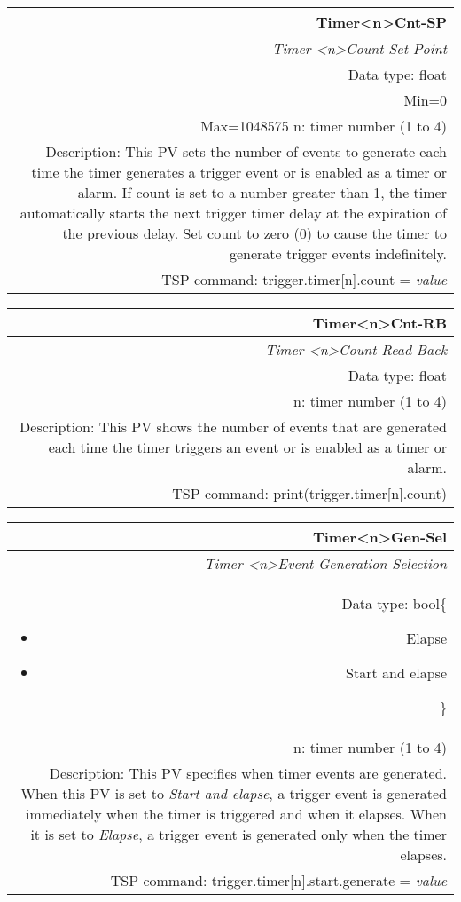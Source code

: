 \documentclass[openany]{article}
\begin{document}
		\begin{tabular}{N}
			\hline
			\bfseries Timer{\textless n\textgreater}Cnt-SP\label{pv:timercount-sp} \\ \hline
			\emph{Timer \textless n\textgreater Count Set Point} \\
			Data type: float \\
			Min=0 \\
			Max=1048575
			n: timer number (1 to 4) \\
			Description: This PV sets the number of events to generate each time the timer generates a trigger event or is enabled as a timer or alarm. If count is set to a number greater than 1, the timer automatically starts the next trigger timer delay at the expiration of the previous delay. Set count to zero (0) to cause the timer to generate trigger events indefinitely. \\
			TSP command: trigger.timer[n].count = \emph{value}
		\end{tabular}

		\begin{tabular}{N}
			\hline
			\bfseries Timer{\textless n\textgreater}Cnt-RB\label{pv:timercount-rb} \\ \hline
			\emph{Timer \textless n\textgreater Count Read Back} \\
			Data type: float \\
			n: timer number (1 to 4) \\
			Description: This PV shows the number of events that are generated each time the timer triggers an event or is enabled as a timer or alarm. \\
			TSP command: print(trigger.timer[n].count)
		\end{tabular}

		\begin{tabular}{N}
			\hline
			\bfseries Timer{\textless n\textgreater}Gen-Sel\label{pv:timergen-sel} \\ \hline
			\emph{Timer \textless n\textgreater Event Generation Selection} \\
			Data type: bool\{\begin{itemize}[noitemsep]
				\small
				\item[] Elapse
				\item[] Start and elapse
			\end{itemize}\} \\
			n: timer number (1 to 4) \\
			Description: This PV specifies when timer events are generated. When this PV is set to \emph{Start and elapse}, a trigger event is generated immediately when the timer is triggered and when it elapses. When it is set to \emph{Elapse}, a trigger event is generated only when the timer elapses. \\
			TSP command: trigger.timer[n].start.generate = \emph{value}
		\end{tabular}
\end{document}
